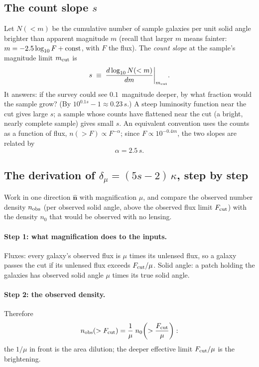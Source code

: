 \documentclass[11pt]{article}
\begin{document}
\subsection{The count slope $s$}
\label{sec:slope}

Let $N(<m)$ be the cumulative number of sample galaxies per unit
solid angle brighter than apparent magnitude $m$ (recall that larger
$m$ means fainter: $m = -2.5\log_{10} F + {\rm const}$, with $F$ the
flux).  The \emph{count slope} at the sample's magnitude limit
$m_{\rm cut}$ is
\begin{equation}
  s \;\equiv\; \frac{d\log_{10} N(<m)}{dm}\bigg|_{m_{\rm cut}} .
  \label{eq:s}
\end{equation}
It answers: if the survey could see $0.1$~magnitude deeper, by what
fraction would the sample grow?  (By $10^{0.1 s} - 1 \approx
0.23\,s$.)  A steep luminosity function near the cut gives large $s$;
a sample whose counts have flattened near the cut (a bright,
nearly complete sample) gives small $s$.  An equivalent convention
uses the counts as a function of flux, $n(>F) \propto F^{-\alpha}$;
since $F \propto 10^{-0.4 m}$, the two slopes are related by
\begin{equation}
  \alpha = 2.5\, s .
  \label{eq:alpha}
\end{equation}

\subsection{The derivation of $\delta_\mu = (5s - 2)\,\kappa$, step by step}
\label{sec:derivation}

Work in one direction $\hat{\mathbf n}$ with magnification $\mu$, and
compare the observed number density $n_{\rm obs}$ (per observed solid
angle, above the observed flux limit $F_{\rm cut}$) with the density
$n_0$ that would be observed with no lensing.

\paragraph{Step 1: what magnification does to the inputs.}
Fluxes: every galaxy's observed flux is $\mu$ times its unlensed
flux, so a galaxy passes the cut if its unlensed flux exceeds
$F_{\rm cut}/\mu$.  Solid angle: a patch holding the galaxies has
observed solid angle $\mu$ times its true solid angle.

\paragraph{Step 2: the observed density.}
Therefore
\begin{equation}
  n_{\rm obs}(>F_{\rm cut})
  = \frac{1}{\mu}\; n_0\!\left(> \frac{F_{\rm cut}}{\mu}\right):
\end{equation}
the $1/\mu$ in front is the area dilution; the deeper effective limit
$F_{\rm cut}/\mu$ is the brightening.
\end{document}
